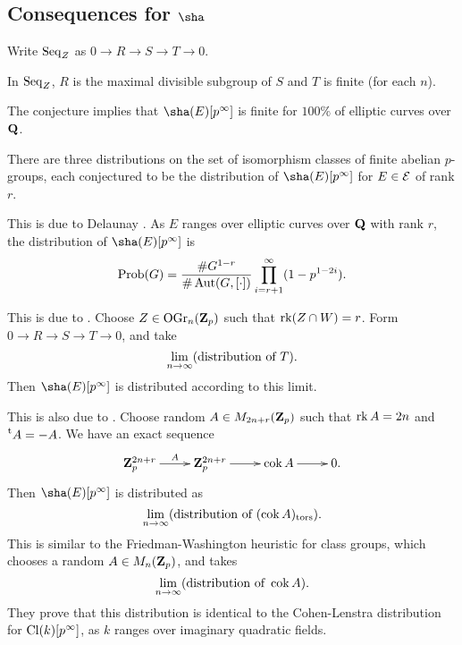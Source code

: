 \subsection{Consequences for \texorpdfstring{$\sha$}{Sha}}

Write $\operatorname{Seq}_Z$ as $0\to R \to S \to T \to 0$. 

\begin{prop}
In $\operatorname{Seq}_Z$, $R$ is the maximal divisible subgroup of $S$ and $T$ is 
finite (for each $n$). 
\end{prop}

\begin{coro}
The conjecture implies that $\sha(E)[p^\infty]$ is finite for 
$100\%$ of elliptic curves over $\mathbf{Q}$. 
\end{coro}

There are three distributions on the set of isomorphism classes of finite 
abelian $p$-groups, each conjectured to be the distribution of 
$\sha(E)[p^\infty]$ for $E\in \mathcal{E}$ of rank $r$. 

\begin{prediction}
This is due to Delaunay \cite{d01}. As $E$ ranges over elliptic curves over 
$\mathbf{Q}$ with rank $r$, the distribution of $\sha(E)[p^\infty]$ is 
\[
  \operatorname{Prob}(G) = \frac{\#G^{1-r}}{\#\operatorname{Aut}(G,[\cdot])}\prod_{i=r+1}^\infty (1-p^{1-2i}) .
\]
\end{prediction}

\begin{prediction}
This is due to \cite{bklpr13}. Choose 
$Z\in \operatorname{OGr}_n(\mathbf{Z}_p)$ such that $\operatorname{rk}(Z\cap W)=r$. Form 
$0 \to R\to S \to T\to 0$, and take 
\[
  \lim_{n\to \infty} (\textnormal{distribution of }T) .
\]
Then $\sha(E)[p^\infty]$ is distributed according to this limit. 
\end{prediction}

\begin{prediction}
This is also due to \cite{bklpr13}. Choose random $A\in M_{2n+r}(\mathbf{Z}_p)$ such 
that $\operatorname{rk} A=2n$ and $\prescript{\mathrm{t}}{}{A}=-A$. We have an exact sequence 
\[\xymatrix{
  \dZ_p^{2n+r} \ar[r]^-A 
    & \dZ_p^{2n+r} \ar[r] 
    & \coker A \ar[r] 
    & 0 .
}\]
Then $\sha(E)[p^\infty]$ is distributed as 
\[
  \lim_{n\to\infty} (\textnormal{distribution of }(\operatorname{cok} A)_\mathrm{tors}) .
\]
This is similar to the Friedman-Washington heuristic for class groups, 
which chooses a random $A\in M_n(\mathbf{Z}_p)$, and takes 
\[
  \lim_{n\to \infty} (\textnormal{distribution of }\operatorname{cok} A) .
\]
They prove that this distribution is identical to the Cohen-Lenstra 
distribution for $\operatorname{Cl}(k)[p^\infty]$, as $k$ ranges over imaginary quadratic 
fields. 
\end{prediction}

